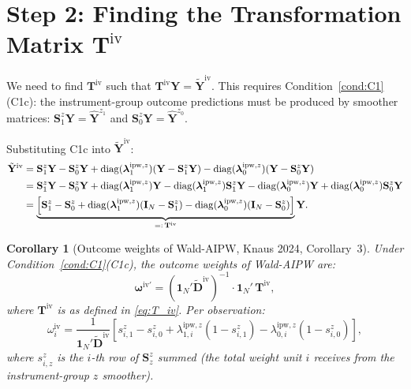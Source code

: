 \documentclass[12pt, a4paper]{article}
\theoremstyle{condstyle}
\theoremstyle{plain}
\newtheorem{corollary}{Corollary}
\newcommand{\bone}{\mathbf{1}_N}
\newcommand{\IN}{\mathbf{I}_N}
\newcommand{\bY}{\mathbf{Y}}
\newcommand{\Yhz}[1]{\hat{\mathbf{Y}}^{z_{#1}}}   %
\newcommand{\Sz}[1]{\mathbf{S}^{z}_{#1}}           %
\newcommand{\lipwz}[1]{\boldsymbol{\lambda}^{\mathrm{ipw},z}_{#1}}
\newcommand{\Tiw}{\mathbf{T}^{\mathrm{iv}}}
\begin{document}
\section{Step 2: Finding the Transformation Matrix $\mathbf{T}^{\mathrm{iv}}$}
\label{sec:step2}

We need to find $\Tiw$ such that $\Tiw\bY = \tilde{\mathbf{Y}}^{\mathrm{iv}}$.
This requires Condition~\ref{cond:C1} (C1c): the instrument-group outcome predictions
must be produced by smoother matrices:
$\Sz{1}\bY = \Yhz{1}$ and $\Sz{0}\bY = \Yhz{0}$.

Substituting C1c into $\tilde{\mathbf{Y}}^{\mathrm{iv}}$:
\begin{align}
  \tilde{\mathbf{Y}}^{\mathrm{iv}}
  &= \Sz{1}\bY - \Sz{0}\bY
    + \mathrm{diag}(\lipwz{1})(\bY - \Sz{1}\bY)
    - \mathrm{diag}(\lipwz{0})(\bY - \Sz{0}\bY) \notag\\
  &= \Sz{1}\bY - \Sz{0}\bY
    + \mathrm{diag}(\lipwz{1})\bY - \mathrm{diag}(\lipwz{1})\Sz{1}\bY
    - \mathrm{diag}(\lipwz{0})\bY + \mathrm{diag}(\lipwz{0})\Sz{0}\bY \notag\\
  &= \underbrace{%
      \left[
        \Sz{1} - \Sz{0}
        + \mathrm{diag}(\lipwz{1})(\IN - \Sz{1})
        - \mathrm{diag}(\lipwz{0})(\IN - \Sz{0})
      \right]
    }_{=:\,\Tiw}\bY.
  \label{eq:T_iv}
\end{align}

\begin{corollary}[Outcome weights of Wald-AIPW, Knaus 2024, Corollary~3]
\label{cor:weights}
Under Condition~\ref{cond:C1}(C1c), the outcome weights of Wald-AIPW are:
\begin{equation}
  \boldsymbol{\omega}^{\mathrm{iv}\prime}
  = (\bone'\tilde{\mathbf{D}}^{\mathrm{iv}})^{-1}\cdot
    \bone'\,\Tiw,
  \label{eq:weights_iv}
\end{equation}
where $\Tiw$ is as defined in \eqref{eq:T_iv}.
Per observation:
\begin{equation}
  \boxed{
  \omega^{\mathrm{iv}}_i
  = \frac{1}{\bone'\tilde{\mathbf{D}}^{\mathrm{iv}}}
    \left[
      s^z_{i,1} - s^z_{i,0}
      + \lambda^{\mathrm{ipw},z}_{1,i}(1 - s^z_{i,1})
      - \lambda^{\mathrm{ipw},z}_{0,i}(1 - s^z_{i,0})
    \right],
  }
  \label{eq:w_iv_scalar}
\end{equation}
where $s^z_{i,z}$ is the $i$-th row of $\Sz{z}$ summed (the total weight unit $i$
receives from the instrument-group $z$ smoother).
\end{corollary}
\end{document}
